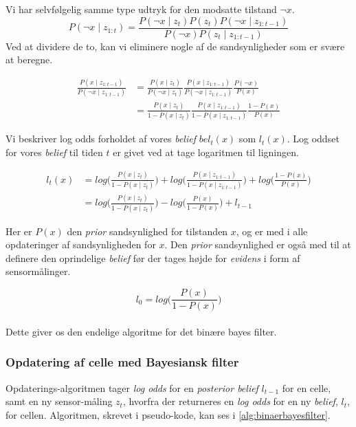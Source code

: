 Vi har selvfølgelig samme type udtryk for den modsatte tilstand $\neg x$.
\begin{equation}
P(\neg x \mid z_{1:t}) = \frac{P(\neg x \mid z_t) P(z_t) P(\neg x \mid z_{1:t-1})}{P(\neg x) P(z_t \mid z_{1:t-1})}
\end{equation}
Ved at dividere de to, kan vi eliminere nogle af de sandsynligheder som er svære at beregne.

\begin{equation}
\begin{split}
	\frac{P(x \mid z_{1:t-1})}{P(\neg x \mid z_{1:t-1})} 
	&= \frac{P(x \mid z_t)}{P(\neg x \mid z_t)} \frac{P(x \mid z_{1:t-1})}{P(\neg x \mid z_{1:t-1})} \frac{P(\neg x)}{P(x)} \\
	&= \frac{P(x \mid z_t)}{1-P(x \mid z_t)} \frac{P(x \mid z_{1:t-1})}{1-P(x \mid z_{1:t-1})} \frac{1-P(x)}{P(x)}
\end{split}
\end{equation}

Vi beskriver log odds forholdet af vores \textit{belief} $bel_t(x)$ som $l_t(x)$. 
Log oddset for vores \textit{belief} til tiden $t$ er givet ved at tage logaritmen til ligningen. 

\begin{equation}
\begin{split}
	l_t(x) &= log\Bigg(\frac{P(x \mid z_t)}{1-P(x \mid z_t)}\Bigg) 
	+ log\Bigg(\frac{P(x \mid z_{1:t-1})}{1-P(x \mid z_{1:t-1})}\Bigg) + log\Bigg(\frac{1-P(x)}{P(x)}\Bigg) \\
	&= log\Bigg(\frac{P(x \mid z_t)}{1-P(x \mid z_t)}\Bigg) - log\Bigg(\frac{P(x)}{1-P(x)}\Bigg) + l_{t-1} 
\end{split}
\end{equation}

Her er $P(x)$ den \textit{prior} sandsynlighed for tilstanden $x$, og er med i alle opdateringer af
sandsynligheden for $x$. Den \textit{prior} sandsynlighed er også med til at definere den oprindelige
\textit{belief} før der tages højde for \textit{evidens} i form af sensormålinger.

\begin{equation}
	l_0 = log\Bigg(\frac{P(x)}{1-P(x)}\Bigg) \label{eqn:l0}
 \end{equation}
\cite[s. 96]{probabilisticRobotics} \\

Dette giver os den endelige algoritme for det binære bayes filter.

\subsubsection{Opdatering af celle med Bayesiansk filter}
Opdaterings-algoritmen tager \textit{log odds} for en \textit{posterior belief} $l_{t-1}$ for en celle, samt en ny sensor-måling $z_t$, hvorfra der returneres en \textit{log odds} for en ny \textit{belief}, $l_t$, for cellen.
Algoritmen, skrevet i pseudo-kode, kan ses i \cref{alg:binaerbayesfilter}.

